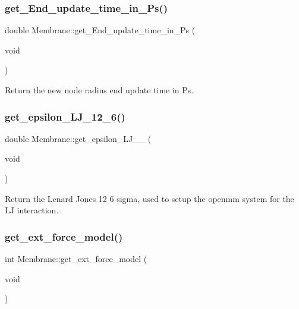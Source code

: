 \mbox{\label{classMembrane_acd5030e3aa5206cffbeaf199d05289f5}} 
\subsubsection{\texorpdfstring{get\_End\_update\_time\_in\_Ps()}{get\_End\_update\_time\_in\_Ps()}}
{\footnotesize\ttfamily double Membrane\+::get\+\_\+\+End\+\_\+update\+\_\+time\+\_\+in\+\_\+\+Ps (\begin{DoxyParamCaption}\item[{void}]{ }\end{DoxyParamCaption})\hspace{0.3cm}{\ttfamily [inline]}}

Return the new node radius \textquotesingle{}end update time\textquotesingle{} in Ps. \mbox{\label{classMembrane_a7546dc8ac92366b2d485e8088e05af9e}} 
\subsubsection{\texorpdfstring{get\_epsilon\_LJ\_12\_6()}{get\_epsilon\_LJ\_12\_6()}}
{\footnotesize\ttfamily double Membrane\+::get\+\_\+epsilon\+\_\+\+L\+J\+\_\+\_ (\begin{DoxyParamCaption}\item[{void}]{ }\end{DoxyParamCaption})\hspace{0.3cm}{\ttfamily [inline]}}

Return the Lenard Jones 12 6 sigma, used to setup the openmm system for the LJ interaction. \mbox{\label{classMembrane_a21c7c4cff243f25e66ff246ca9d3f7c1}} 
\subsubsection{\texorpdfstring{get\_ext\_force\_model()}{get\_ext\_force\_model()}}
{\footnotesize\ttfamily int Membrane\+::get\+\_\+ext\+\_\+force\+\_\+model (\begin{DoxyParamCaption}\item[{void}]{ }\end{DoxyParamCaption})\hspace{0.3cm}{\ttfamily [inline]}}

